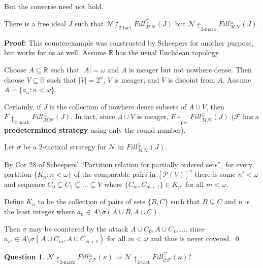 \documentclass{beamer}
\theoremstyle{theorem}
\theoremstyle{definition}
\newtheorem{question}[theorem]{Question}
\newcommand{\prewin}{\uparrow_{\text{pre}}}
\newcommand{\ktactwin}[1]{\uparrow_{#1\text{-tact}}}
\newcommand{\kmarkwin}[1]{\uparrow_{#1\text{-mark}}}
\newcommand{\fillgame}[1]{Fill^{\subseteq}_{\pl M\pl N}(#1)}
\newcommand{\sfillgame}[1]{Fill^{\subsetneq}_{\pl M\pl N}(#1)}
\newcommand{\kfillgame}[1]{Fill^{\subseteq}_{\pl C\pl F}(#1)}
\newcommand{\ksfillgame}[1]{Fill^{\subsetneq}_{\pl C\pl F}(#1)}
\newcommand{\pow}[1]{\mc{P}(#1)}
\newcommand{\<}{\langle}
\renewcommand{\>}{\rangle}
\newcommand{\mc}[1]{\mathcal{#1}}
\newcommand{\pl}[1]{\mathscr{#1}}
\begin{document}
\begin{frame}
But the converse need not hold.\pause

  \begin{theorem}
    There is a free ideal $J$ such that $\pl N\not\ktactwin{2}\sfillgame{J}$ but $\pl N\kmarkwin{2}\fillgame{J}$.
  \end{theorem}
  {\small
  \textbf{Proof:}
    This counterexample was constructed by Scheepers for another purpose, but works for us as well. Assume $\mathbb{R}$ has the usual Euclidean topology.\vspace{12pt}

    Choose $A\subseteq\mathbb{R}$ such that $|A|=\omega$ and $A$ is meager but not nowhere dense. Then choose $V\subseteq\mathbb{R}$ such that $|V|=2^\omega$, $V$ is meager, and $V$ is disjoint from $A$. Assume $A=\{a_n:n<\omega\}$.\pause\vspace{12pt}

    Certainly, if $J$ is the collection of nowhere dense subsets of $A\cup V$, then $F\kmarkwin{2}\fillgame{J}$. In fact, since $A\cup V$ is meager, $F\prewin\fillgame{J}$ ($\pl F$ has a \textbf{predetermined strategy} using only the round number). 
    }
\end{frame}
\begin{frame}

    Let $\sigma$ be a $2$-tactical strategy for $\pl N$ in $\sfillgame{J}$.\pause\vspace{12pt}

    By Cor 28 of Scheepers' ``Partition relation for partially ordered sets'', for every partition $\{K_n:n<\omega\}$ of the comparable pairs in $[\pow{V}]^2$ there is some $n'<\omega$ and sequence $C_0\subsetneq C_1\subsetneq \dots\subsetneq V$ where $\{C_m,C_{m+1}\}\in K_{n'}$ for all $m<\omega$.\pause\vspace{12pt}

    Define $K_n$ to be the collection of pairs of sets $\{B,C\}$ such that $B\subsetneq C$ and $n$ is the least integer where $a_n \in A \setminus \sigma(A\cup B,A\cup C)$.\pause\vspace{12pt}

    Then $\sigma$ may be countered by the attack $A\cup C_0, A\cup C_1, \dots$, since $a_{n'} \in A \setminus \sigma(A\cup C_m,A\cup C_{m+1})$ for all $m<\omega$ and thus is never covered. \qed\pause

    \begin{question}
      $\pl N\kmarkwin{2}\kfillgame{\kappa}\Rightarrow \pl N\ktactwin{2}\ksfillgame{\kappa}$?
    \end{question}
\end{frame}
\end{document}
